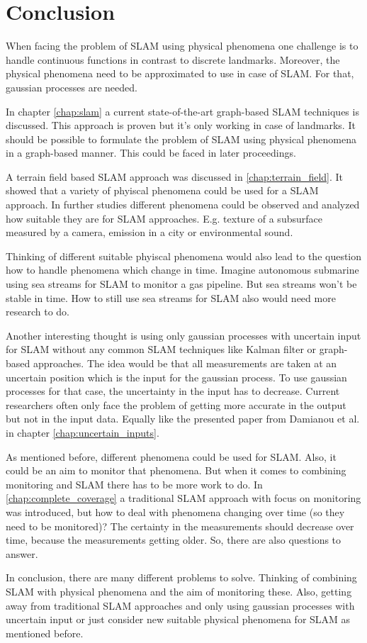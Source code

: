 \section{Conclusion}
When facing the problem of SLAM using physical phenomena one challenge is
to handle continuous functions in contrast to discrete landmarks. Moreover,
the physical phenomena need to be approximated to use in case of SLAM. 
For that, gaussian processes are needed.

In chapter \ref{chap:slam} a current state-of-the-art graph-based SLAM
techniques is discussed. This approach is proven but it's only working
in case of landmarks. It should be possible to formulate the problem
of SLAM using physical phenomena in a graph-based manner. This could
be faced in later proceedings.

A terrain field based SLAM approach was discussed in \ref{chap:terrain_field}.
It showed that a variety of phyiscal phenomena could be used for a SLAM approach.
In further studies different phenomena could be observed and analyzed how suitable
they are for SLAM approaches. E.g. texture of a subsurface measured by a camera,
emission in a city or environmental sound.

Thinking of different suitable phyiscal phenomena would also lead to the question
how to handle phenomena which change in time. Imagine autonomous submarine using
sea streams for SLAM to monitor a gas pipeline. But sea streams won't be stable
in time. How to still use sea streams for SLAM also would need more research to do.

Another interesting thought is using only gaussian processes with uncertain input
for SLAM without any common SLAM techniques like Kalman filter or graph-based 
approaches. The idea would be that all measurements are taken at an uncertain
position which is the input for the gaussian process. To use gaussian processes
for that case, the uncertainty in the input has to decrease. Current researchers
often only face the problem of getting more accurate in the output but not in the
input data. Equally like the presented paper from Damianou et al. in chapter 
\ref{chap:uncertain_inputs}.

As mentioned before, different phenomena could be used for SLAM. Also, it could 
be an aim to monitor that phenomena. But when it comes to combining monitoring
and SLAM there has to be more work to do. In \ref{chap:complete_coverage} a
traditional SLAM approach with focus on monitoring was introduced, but how to
deal with phenomena changing over time (so they need to be monitored)? The certainty 
in the measurements should decrease over time, because the measurements getting older. 
So, there are also questions to answer.

In conclusion, there are many different problems to solve. Thinking of combining
SLAM with physical phenomena and the aim of monitoring these. Also, getting away
from traditional SLAM approaches and only using gaussian processes with uncertain
input or just consider new suitable physical phenomena for SLAM as mentioned before.